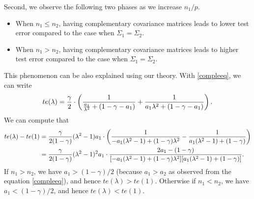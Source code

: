 \begin{example}
Second, we observe the following two phases as we increase $n_1 / p$.
\begin{itemize}
	\item When $n_1 \le n_2$, having complementary covariance matrices leads to lower test error compared to the case when $\Sigma_1 = \Sigma_2$.
	\item When $n_1 > n_2$, having complementary covariance matrices leads to higher test error compared to the case when $\Sigma_1 = \Sigma_2$.
\end{itemize}
This phenomenon can be also explained using our theory. With \eqref{compleeq}, we can write
$$te(\lambda)=\frac{\gamma}{2} \cdot \left({\frac{1}{\frac{a_1}{\lambda^2} + (1-\gamma - a_1)} + \frac{1}{a_1\lambda^2 + (1-\gamma - a_1)}}\right).$$
We can compute that
\begin{align*}
te(\lambda) - te(1)&= \frac{\gamma}{2(1-\gamma)} (\lambda^2-1)a_1\cdot \left({  \frac{1}{ -a_1(\lambda^2-1)+(1-\gamma)\lambda^2 } - \frac{1}{a_1(\lambda^2-1) + (1-\gamma)}}\right) \\
&= \frac{\gamma}{2(1-\gamma)} (\lambda^2-1)^2 a_1\cdot  \frac{2a_1 - (1-\gamma) }{[-a_1(\lambda^2-1)+(1-\gamma)\lambda^2 ][a_1(\lambda^2-1) + (1-\gamma)]} .
\end{align*}
If $n_1>n_2$, we have $a_1>(1-\gamma)/2$ (because $a_1>a_2$ as observed from the equation \eqref{compleeq}), and hence $te(\lambda)>te(1)$. Otherwise if $n_1< n_2$, we have $a_1< (1-\gamma)/2$, and hence $te(\lambda)< te(1)$.

\end{example}

